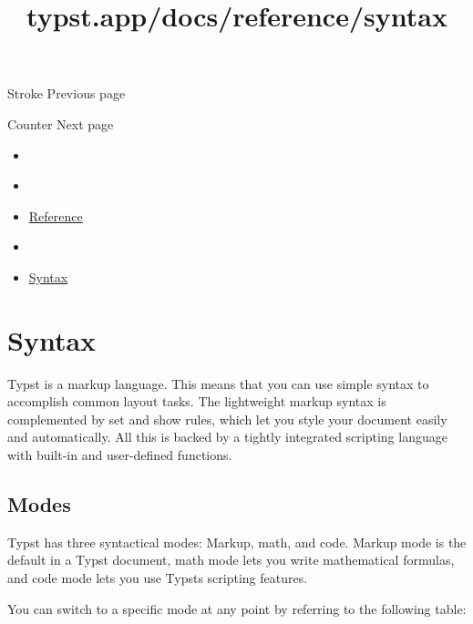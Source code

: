 { Stroke } { Previous page }

\href{/docs/reference/introspection/counter/}{\pandocbounded{}}

{ Counter } { Next page }


\title{typst.app/docs/reference/syntax}

\begin{itemize}
\tightlist
\item
  \href{/docs}{}
\item
  
\item
  \href{/docs/reference/}{Reference}
\item
  
\item
  \href{/docs/reference/syntax/}{Syntax}
\end{itemize}

\section{Syntax}\label{syntax}

Typst is a markup language. This means that you can use simple syntax to
accomplish common layout tasks. The lightweight markup syntax is
complemented by set and show rules, which let you style your document
easily and automatically. All this is backed by a tightly integrated
scripting language with built-in and user-defined functions.

\subsection{Modes}\label{modes}

Typst has three syntactical modes: Markup, math, and code. Markup mode
is the default in a Typst document, math mode lets you write
mathematical formulas, and code mode lets you use
Typst\textquotesingle s scripting features.

You can switch to a specific mode at any point by referring to the
following table:


